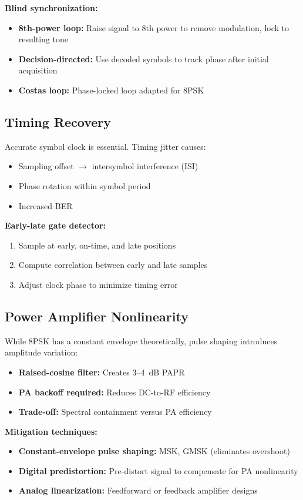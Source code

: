 \textbf{Blind synchronization:}
\begin{itemize}
\item \textbf{8th-power loop:} Raise signal to 8th power to remove modulation, lock to resulting tone
\item \textbf{Decision-directed:} Use decoded symbols to track phase after initial acquisition
\item \textbf{Costas loop:} Phase-locked loop adapted for 8PSK
\end{itemize}

\subsection{Timing Recovery}

Accurate symbol clock is essential. Timing jitter causes:
\begin{itemize}
\item Sampling offset $\rightarrow$ intersymbol interference (ISI)
\item Phase rotation within symbol period
\item Increased BER
\end{itemize}

\textbf{Early-late gate detector:}
\begin{enumerate}
\item Sample at early, on-time, and late positions
\item Compute correlation between early and late samples
\item Adjust clock phase to minimize timing error
\end{enumerate}

\subsection{Power Amplifier Nonlinearity}

While 8PSK has a constant envelope theoretically, pulse shaping introduces amplitude variation:
\begin{itemize}
\item \textbf{Raised-cosine filter:} Creates 3--4~dB PAPR
\item \textbf{PA backoff required:} Reduces DC-to-RF efficiency
\item \textbf{Trade-off:} Spectral containment versus PA efficiency
\end{itemize}

\textbf{Mitigation techniques:}
\begin{itemize}
\item \textbf{Constant-envelope pulse shaping:} MSK, GMSK (eliminates overshoot)
\item \textbf{Digital predistortion:} Pre-distort signal to compensate for PA nonlinearity
\item \textbf{Analog linearization:} Feedforward or feedback amplifier designs
\end{itemize}

